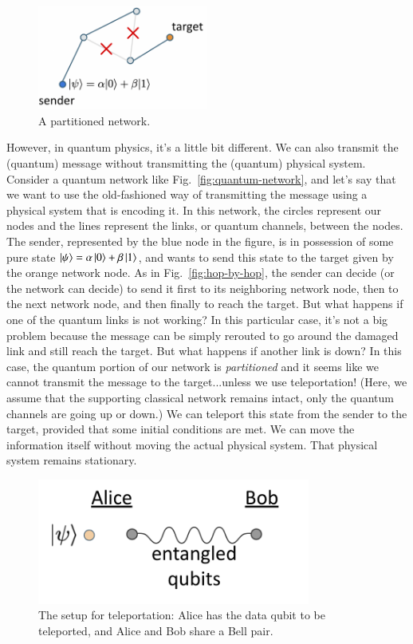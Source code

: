 \begin{figure}[H]
    \centering
    \includegraphics[width=0.5\textwidth]{lesson8/partitioned.png}
        \caption{A partitioned network.}
    \label{fig:partition}
\end{figure}


However, in quantum physics, it's a little bit different. We can also transmit the (quantum) message without transmitting the (quantum) physical system. Consider a quantum network like Fig.~\ref{fig:quantum-network}, and let's say that we want to use the old-fashioned way of transmitting the message using a physical system that is encoding it. In this network, the circles represent our nodes and the lines represent the links, or quantum channels, between the nodes. The sender, represented by the blue node in the figure, is in possession of some pure state $\left| \psi \right\rangle = \alpha\left| 0 \right\rangle+\beta\left| 1 \right\rangle$, and  wants to send this state to the target given by the orange network node. As in Fig.~\ref{fig:hop-by-hop}, the sender can decide (or the network can decide) to send it first to its neighboring network node, then to the next network node, and then finally to reach the target. But what happens if one of the quantum links is not working? In this particular case, it's not a big problem because the message can be simply rerouted to go around the damaged link and still reach the target. But what happens if another link is down? In this case, the quantum portion of our network is \emph{partitioned} and it seems like we cannot transmit the message to the target...unless we use teleportation! (Here, we assume that the supporting classical network remains intact, only the quantum channels are going up or down.) We can teleport this state from the sender to the target, provided that some initial conditions are met. We can move the information itself without moving the actual physical system. That physical system remains stationary.

\begin{figure}[H]
    \centering
    \includegraphics[width=0.8\textwidth]{lesson8/teleportation-setup.png}
        \caption{The setup for teleportation: Alice has the data qubit to be teleported, and Alice and Bob share a Bell pair.}
    \label{fig:teleportation-setup}
\end{figure}


